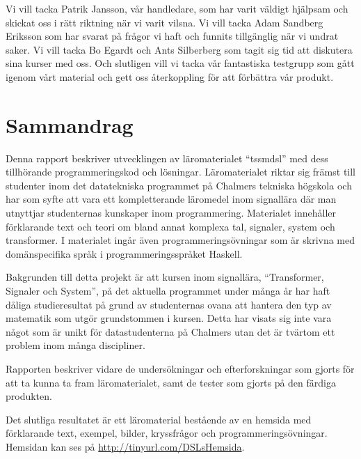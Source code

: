 \documentclass[12pt,a4paper,twoside,openright]{article}
\begin{document}
Vi vill tacka Patrik Jansson, vår handledare, som har varit väldigt
hjälpsam och skickat oss i rätt riktning när vi varit vilsna. Vi vill
tacka Adam Sandberg Eriksson som har svarat på frågor vi haft och
funnits tillgänglig när vi undrat saker. Vi vill tacka Bo Egardt och
Ants Silberberg som tagit sig tid att diskutera sina kurser med
oss. Och slutligen vill vi tacka vår fantastiska testgrupp som gått
igenom vårt material och gett oss återkoppling för att förbättra vår
produkt.

\newpage

\thispagestyle{plain}

\section*{Sammandrag}
Denna rapport beskriver utvecklingen av läromaterialet ``\gls{tssmdsl}''
med dess tillhörande programmeringskod och lösningar. Läromaterialet
riktar sig främst till studenter inom det datatekniska programmet på
Chalmers tekniska högskola och har som syfte att vara ett
kompletterande läromedel inom signallära där man utnyttjar
studenternas kunskaper inom programmering. Materialet innehåller
förklarande text och teori om bland annat komplexa tal, signaler,
system och transformer. I materialet ingår även programmeringsövningar
som är skrivna med domänspecifika språk i programmeringsspråket
\gls{Haskell}.

Bakgrunden till detta projekt är att kursen inom signallära,
``Transformer, Signaler och System'', på det aktuella programmet under
många år har haft dåliga studieresultat på grund av studenternas ovana
att hantera den typ av matematik som utgör grundstommen i
kursen. Detta har visats sig inte vara något som är unikt för
datastudenterna på Chalmers utan det är tvärtom ett problem inom många
discipliner.

Rapporten beskriver vidare de undersökningar och efterforskningar som
gjorts för att ta kunna ta fram läromaterialet, samt de tester som
gjorts på den färdiga produkten.

Det slutliga resultatet är ett läromaterial bestående av en hemsida med
förklarande text, exempel,  bilder, kryssfrågor och programmeringsövningar.
Hemsidan kan ses på \url{http://tinyurl.com/DSLsHemsida}.
\end{document}
